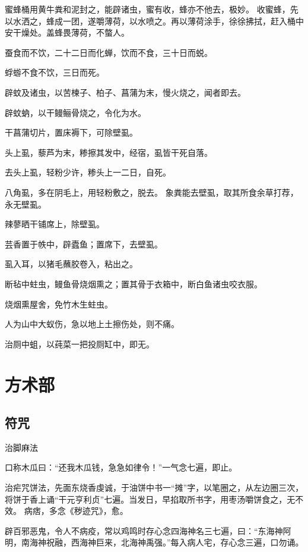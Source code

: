 \documentclass[a4paper,12pt,UTF8,twoside]{ctexbook}
\begin{document}
    蜜蜂桶用黄牛粪和泥封之，能辟诸虫，蜜有收，蜂亦不他去，极妙。 收蜜蜂，先以水洒之，蜂成一团，遂嚼薄荷，以水喷之。再以薄荷涂手，徐徐拂拭，赶入桶中安干燥处。盖蜂畏薄荷，不螫人。
    
    蚕食而不饮，二十二日而化蝉，饮而不食，三十日而蜕。
    
    蜉蝣不食不饮，三日而死。
    
    辟蚊及诸虫，以苦楝子、柏子、菖蒲为末，慢火烧之，闻者即去。
    
    辟蚊蚋，以干鳗鲡骨烧之，令化为水。
    
    干菖蒲切片，置床褥下，可除壁虱。
    
    头上虱，藜芦为末，糁擦其发中，经宿，虱皆干死自落。
    
    去头上虱，轻粉少许，糁头上一二日，自死。
    
    八角虱，多在阴毛上，用轻粉敷之，脱去。 象粪能去壁虱，取其所食余草打荐，永无壁虱。
    
    辣蓼晒干铺席上，除壁虱。
    
    芸香置于帙中，辟蠹鱼；置席下，去壁虱。
    
    虱入耳，以猪毛蘸胶卷入，粘出之。
    
    断毡中蛀虫，鳗鱼骨烧烟熏之；置其骨于衣箱中，断白鱼诸虫咬衣服。
    
    烧烟熏屋舍，免竹木生蛀虫。
    
    人为山中大蚁伤，急以地上土擦伤处，则不痛。
    
    治厕中蛆，以莼菜一把投厕缸中，即无。
    
    \part{方术部}
    
    \chapter{符咒}
    
    治脚麻法
    
    口称木瓜曰：“还我木瓜钱，急急如律令！”一气念七遍，即止。
    
    治疟咒饼法，先面东烧香虔诚，于油饼中书一“摊”字，以笔圈之，从左边圈三次，将饼于香上诵“干元亨利贞”七遍。当发日，早掐取所书字，用枣汤嚼饼食之，无不效。 病痞，多念《秽迹咒》，愈。
    
    辟百邪恶鬼，令人不病疫，常以鸡鸣时存心念四海神名三七遍，曰：“东海神阿明，南海神祝融，西海神巨来，北海神禹强。”每入病人宅，存心念三遍，口勿诵。
    
\end{document}
